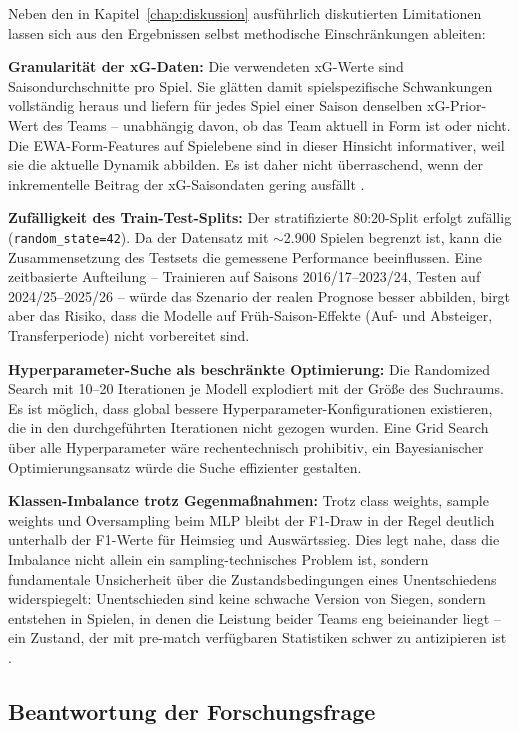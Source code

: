 Neben den in Kapitel~\ref{chap:diskussion} ausführlich diskutierten
Limitationen lassen sich aus den Ergebnissen selbst methodische
Einschränkungen ableiten:

\textbf{Granularität der xG-Daten:} Die verwendeten xG-Werte sind
Saisondurchschnitte pro Spiel. Sie glätten damit spielspezifische
Schwankungen vollständig heraus und liefern für jedes Spiel einer Saison
denselben xG-Prior-Wert des Teams -- unabhängig davon, ob das Team
aktuell in Form ist oder nicht. Die EWA-Form-Features auf Spielebene
sind in dieser Hinsicht informativer, weil sie die aktuelle Dynamik
abbilden. Es ist daher nicht überraschend, wenn der inkrementelle Beitrag
der xG-Saisondaten gering ausfällt \cite{Wheatcroft2022}.

\textbf{Zufälligkeit des Train-Test-Splits:} Der stratifizierte
80:20-Split erfolgt zufällig (\texttt{random\_state=42}). Da der
Datensatz mit $\sim$2.900 Spielen begrenzt ist, kann die Zusammensetzung
des Testsets die gemessene Performance beeinflussen. Eine zeitbasierte
Aufteilung -- Trainieren auf Saisons 2016/17--2023/24, Testen auf
2024/25--2025/26 -- würde das Szenario der realen Prognose besser
abbilden, birgt aber das Risiko, dass die Modelle auf Früh-Saison-Effekte
(Auf- und Absteiger, Transferperiode) nicht vorbereitet sind.

\textbf{Hyperparameter-Suche als beschränkte Optimierung:} Die
Randomized Search mit 10--20 Iterationen je Modell explodiert mit der
Größe des Suchraums. Es ist möglich, dass global bessere
Hyperparameter-Konfigurationen existieren, die in den durchgeführten
Iterationen nicht gezogen wurden. Eine Grid Search über alle
Hyperparameter wäre rechentechnisch prohibitiv, ein Bayesianischer
Optimierungsansatz \cite{Snoek2012} würde die Suche effizienter gestalten.

\textbf{Klassen-Imbalance trotz Gegenmaßnahmen:} Trotz class weights,
sample weights und Oversampling beim MLP bleibt der F1-Draw in der
Regel deutlich unterhalb der F1-Werte für Heimsieg und Auswärtssieg.
Dies legt nahe, dass die Imbalance nicht allein ein sampling-technisches
Problem ist, sondern fundamentale Unsicherheit über die Zustandsbedingungen
eines Unentschiedens widerspiegelt: Unentschieden sind keine
\glqq schwache Version\grqq{} von Siegen, sondern entstehen in Spielen,
in denen die Leistung beider Teams eng beieinander liegt -- ein
Zustand, der mit pre-match verfügbaren Statistiken schwer zu antizipieren ist
\cite{DobsonGoddard2011,Sumpter2016}.

\subsection{Beantwortung der Forschungsfrage}

